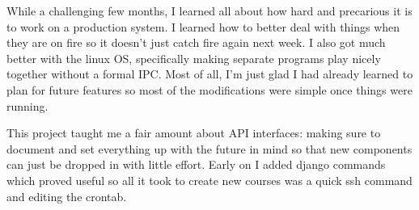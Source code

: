While a challenging few months, I learned all about how hard and
precarious it is to work on a production system. I learned how to better
deal with things when they are on fire so it doesn't just catch fire
again next week. I also got much better with the linux OS, specifically
making separate programs play nicely together without a formal IPC. Most
of all, I'm just glad I had already learned to plan for future features
so most of the modifications were simple once things were running.

This project taught me a fair amount about API interfaces: making sure
to document and set everything up with the future in mind so that new
components can just be dropped in with little effort. Early on I added
django commands which proved useful so all it took to create new courses
was a quick ssh command and editing the crontab.

